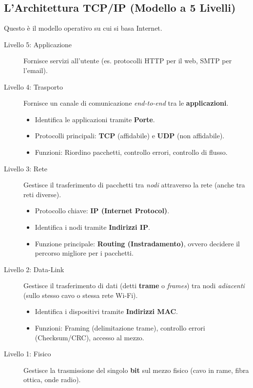 \documentclass[../main.tex]{subfiles}
\begin{document}
\subsection{L'Architettura TCP/IP (Modello a 5 Livelli)}
Questo è il modello operativo su cui si basa Internet.
\begin{description}
    \item[Livello 5: Applicazione] Fornisce servizi all'utente (es. protocolli HTTP per il web, SMTP per l'email).
    
    \item[Livello 4: Trasporto] Fornisce un canale di comunicazione \emph{end-to-end} tra le \textbf{applicazioni}.
    \begin{itemize}
        \item Identifica le applicazioni tramite \textbf{Porte}.
        \item Protocolli principali: \textbf{TCP} (affidabile) e \textbf{UDP} (non affidabile).
        \item Funzioni: Riordino pacchetti, controllo errori, controllo di flusso.
    \end{itemize}
    
    \item[Livello 3: Rete] Gestisce il trasferimento di pacchetti tra \emph{nodi} attraverso la rete (anche tra reti diverse).
    \begin{itemize}
        \item Protocollo chiave: \textbf{IP (Internet Protocol)}.
        \item Identifica i nodi tramite \textbf{Indirizzi IP}.
        \item Funzione principale: \textbf{Routing (Instradamento)}, ovvero decidere il percorso migliore per i pacchetti.
    \end{itemize}
    
    \item[Livello 2: Data-Link] Gestisce il trasferimento di dati (detti \textbf{trame} o \emph{frames}) tra nodi \emph{adiacenti} (sullo stesso cavo o stessa rete Wi-Fi).
    \begin{itemize}
        \item Identifica i dispositivi tramite \textbf{Indirizzi MAC}.
        \item Funzioni: Framing (delimitazione trame), controllo errori (Checksum/CRC), accesso al mezzo.
    \end{itemize}
    
    \item[Livello 1: Fisico] Gestisce la trasmissione del singolo \textbf{bit} sul mezzo fisico (cavo in rame, fibra ottica, onde radio).
\end{description}
\end{document}
